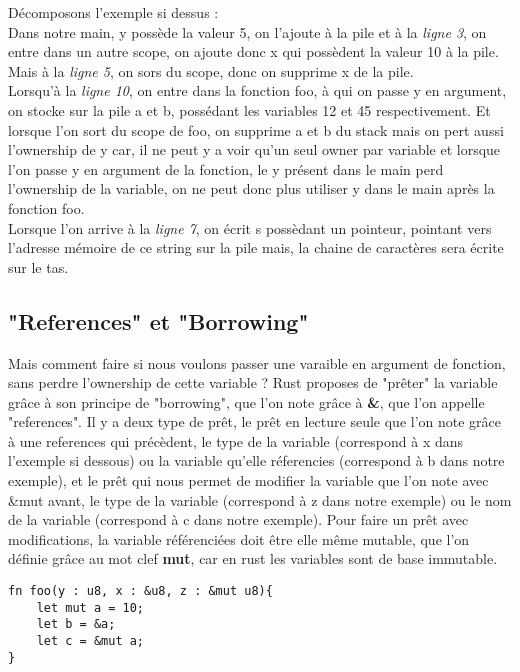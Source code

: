 \documentclass{article}
\begin{document}
Décomposons l'exemple si dessus : \\
Dans notre main, y possède la valeur 5, on l'ajoute à la pile et à la \textit{ligne 3}, on entre dans un autre scope, on ajoute donc x qui possèdent la valeur 10 à la pile. Mais à la  \textit{ligne 5}, on sors du scope, donc on supprime x de la pile. \\
Lorsqu'à la \textit{ligne 10}, on entre dans la fonction foo, à qui on passe y en argument, on stocke sur la pile a et b, possédant les variables 12 et 45 respectivement. Et lorsque l'on sort du scope de foo, on supprime a et b du stack mais on pert aussi l'ownership de y car, il ne peut y a voir qu'un seul owner par variable et lorsque l'on passe y en argument de la fonction, le y présent dans le main perd l'ownership de la variable, on ne peut donc plus utiliser y dans le main après la fonction foo. \\
Lorsque l'on  arrive à la \textit{ligne 7}, on écrit s possèdant un pointeur, pointant vers l'adresse mémoire de ce string sur la pile mais, la chaine de caractères sera écrite sur le tas.

\subsection{"References" et "Borrowing"}

Mais comment faire si nous voulons passer une varaible en argument de fonction, sans perdre l'ownership de cette variable ? Rust proposes de "prêter" la variable grâce à son principe de "borrowing", que l'on note grâce à \textbf{\&}, que l'on appelle "references". Il y a deux type de prêt, le prêt en lecture seule que l'on note grâce à une references qui précèdent, le type de la variable (correspond à x dans l'exemple si dessous) ou la variable qu'elle réferencies (correspond à b dans notre exemple), et le prêt qui nous permet de modifier la variable que l'on note avec \&mut avant, le type de la variable (correspond à z dans notre exemple) ou le nom de la variable (correspond à c dans notre exemple). Pour faire un prêt avec modifications, la variable référenciées doit être elle même mutable, que l'on définie grâce au mot clef \textbf{mut}, car en rust les variables sont de base immutable.

\begin{lstlisting}
fn foo(y : u8, x : &u8, z : &mut u8){
    let mut a = 10;
    let b = &a;
    let c = &mut a;
}
\end{lstlisting}
\end{document}
